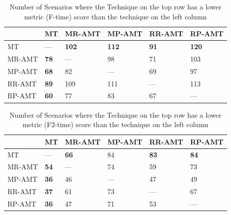 \documentclass[10pt,journal,compsoc]{IEEEtran}
\begin{document}
\begin{table}[htbp]
  \caption{Number of Scenarios where the Technique on the top row has a lower metric (F-time) score than the technique on the left column}
  \centering
  \label{tableHlom:ftime}
  \renewcommand\tabcolsep{4.0pt}
  \begin{tabular}{llllll}  \toprule
             &MT               &MR-AMT             &MP-AMT             &RR-AMT             &RP-AMT  \\ \midrule
    MT       &---              &\textbf{102}       &\textbf{112}       &\textbf{91}       &\textbf{120}     \\
    MR-AMT   &\textbf{78}      &---                &98                 &71                 &103 \\
    MP-AMT   &\textbf{68}      &82                 &---                &69                 &97 \\
    RR-AMT   &\textbf{89}      &109                &111                &---                &113 \\
    RP-AMT   &\textbf{60}      &77                 &83                 &67                 &--- \\ \bottomrule
  \end{tabular}
\end{table}

\begin{table}[htbp]
  \caption{Number of Scenarios where the Technique on the top row has a lower metric (F2-time) score than the technique on the left column}
  \centering
  \label{tableHlom:f2time}
  \renewcommand\tabcolsep{4.0pt}
  \begin{tabular}{llllll}  \toprule
             &MT              &MR-AMT             &MP-AMT             &RR-AMT             &RP-AMT  \\ \midrule
    MT       &---             &\textbf{66}        &84                 &\textbf{83}        &\textbf{84}     \\
    MR-AMT   &\textbf{54}     &---                &74                 &59                 &73  \\
    MP-AMT   &\textbf{36}     &46                 &---                &47                 &49 \\
    RR-AMT   &\textbf{37}     &61                 &73                 &---                &67 \\
    RP-AMT   &\textbf{36}     &47                 &71                 &53                 &--- \\ \bottomrule
  \end{tabular}
\end{table}
\end{document}
